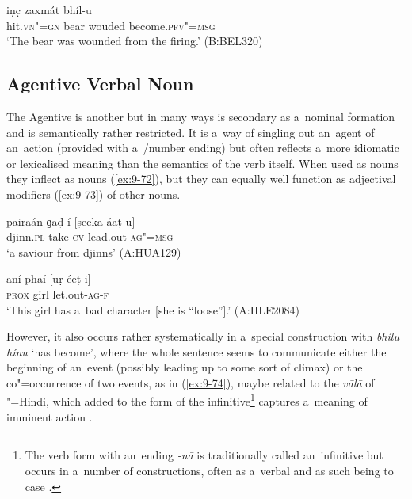 \begin{exe}
\ex
\label{ex:9-71}
\gll [ǰeníi-e] iṇc̣ zaxmát bhíl-u \\
hit.\textsc{vn"=gn} bear wouded become.\textsc{pfv"=msg} \\
\glt `The bear was wounded from the firing.' (B:BEL320)
\end{exe}

\subsection{Agentive Verbal Noun}
\label{subsec:9-3-4}


The Agentive  is another  but in many ways is secondary as a~nominal formation and is semantically rather restricted. It is a~way of singling out an~agent of an~action (provided with a~/number ending) but often reflects a~more idiomatic or lexicalised meaning than the semantics of the verb itself. When used as nouns they inflect as nouns (\ref{ex:9-72}), but they can equally well function as adjectival modifiers (\ref{ex:9-73}) of other nouns.

\begin{exe}
\ex
\label{ex:9-72}
\gll pairaán ɡaḍ-í [ṣeeka-áaṭ-u] \\
djinn.\textsc{pl} take-\textsc{cv} lead.out-\textsc{ag"=msg} \\
\glt `a saviour from djinns' (A:HUA129)

\ex
\label{ex:9-73}
\gll aní phaí [uṛ-éeṭ-i] \\
\textsc{prox} girl let.out-\textsc{ag-f} \\
\glt `This girl has a~bad character [she is ``loose''].' (A:HLE2084)
\end{exe}

However, it also occurs rather systematically in a~special construction with \textit{bhílu hínu} `has become', where the whole sentence seems to communicate either the beginning of an~event (possibly leading up to some sort of climax) or the co"=occurrence of two events, as in (\ref{ex:9-74}), maybe related to the \textit{vālā} of "=Hindi, which added to the  form of the infinitive\footnote{The  verb form with an~ending \textit{-nā} is traditionally called an~infinitive but occurs in a~number of constructions, often as a~verbal  and as such being  to case  \citep[132--142]{schmidt1999}.} captures a~meaning of imminent action \citep[139]{schmidt1999}. 

